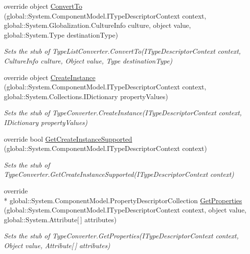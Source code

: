 \begin{DoxyCompactItemize}
override object \hyperlink{class_system_1_1_component_model_1_1_fakes_1_1_stub_type_list_converter_aee60c715f0359a70a76099d0a3b6c5c2}{Convert\-To} (global\-::\-System.\-Component\-Model.\-I\-Type\-Descriptor\-Context context, global\-::\-System.\-Globalization.\-Culture\-Info culture, object value, global\-::\-System.\-Type destination\-Type)
\begin{DoxyCompactList}\small\item\em Sets the stub of Type\-List\-Converter.\-Convert\-To(\-I\-Type\-Descriptor\-Context context, Culture\-Info culture, Object value, Type destination\-Type)\end{DoxyCompactList}\item 
override object \hyperlink{class_system_1_1_component_model_1_1_fakes_1_1_stub_type_list_converter_a4096350899415d75a470bdaf4aa1b9e8}{Create\-Instance} (global\-::\-System.\-Component\-Model.\-I\-Type\-Descriptor\-Context context, global\-::\-System.\-Collections.\-I\-Dictionary property\-Values)
\begin{DoxyCompactList}\small\item\em Sets the stub of Type\-Converter.\-Create\-Instance(\-I\-Type\-Descriptor\-Context context, I\-Dictionary property\-Values)\end{DoxyCompactList}\item 
override bool \hyperlink{class_system_1_1_component_model_1_1_fakes_1_1_stub_type_list_converter_afe1d3ed32c277ffda863c6337aa70200}{Get\-Create\-Instance\-Supported} (global\-::\-System.\-Component\-Model.\-I\-Type\-Descriptor\-Context context)
\begin{DoxyCompactList}\small\item\em Sets the stub of Type\-Converter.\-Get\-Create\-Instance\-Supported(\-I\-Type\-Descriptor\-Context context)\end{DoxyCompactList}\item 
override \\*
global\-::\-System.\-Component\-Model.\-Property\-Descriptor\-Collection \hyperlink{class_system_1_1_component_model_1_1_fakes_1_1_stub_type_list_converter_ae7cd2a0a5dde52c1d28edf4ba9b05539}{Get\-Properties} (global\-::\-System.\-Component\-Model.\-I\-Type\-Descriptor\-Context context, object value, global\-::\-System.\-Attribute\mbox{[}$\,$\mbox{]} attributes)
\begin{DoxyCompactList}\small\item\em Sets the stub of Type\-Converter.\-Get\-Properties(\-I\-Type\-Descriptor\-Context context, Object value, Attribute\mbox{[}$\,$\mbox{]} attributes)\end{DoxyCompactList}\item 

\end{DoxyCompactItemize}

